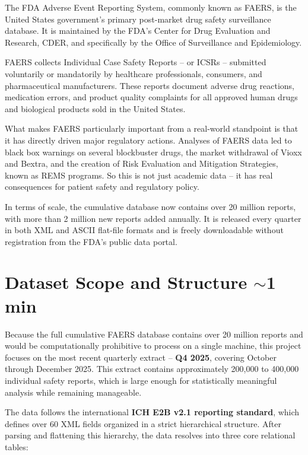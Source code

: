 \documentclass[12pt, letterpaper]{article}
\begin{document}
The FDA Adverse Event Reporting System, commonly known as FAERS, is the United
States government's primary post-market drug safety surveillance database. It is
maintained by the FDA's Center for Drug Evaluation and Research, CDER, and
specifically by the Office of Surveillance and Epidemiology.

FAERS collects Individual Case Safety Reports -- or ICSRs -- submitted
voluntarily or mandatorily by healthcare professionals, consumers, and
pharmaceutical manufacturers. These reports document adverse drug reactions,
medication errors, and product quality complaints for all approved human drugs
and biological products sold in the United States.

What makes FAERS particularly important from a real-world standpoint is that it
has directly driven major regulatory actions. Analyses of FAERS data led to
black box warnings on several blockbuster drugs, the market withdrawal of
Vioxx and Bextra, and the creation of Risk Evaluation and Mitigation Strategies,
known as REMS programs. So this is not just academic data -- it has real
consequences for patient safety and regulatory policy.

In terms of scale, the cumulative database now contains over 20 million reports,
with more than 2 million new reports added annually. It is released every
quarter in both XML and ASCII flat-file formats and is freely downloadable
without registration from the FDA's public data portal.

\section{Dataset Scope and Structure \hfill \textcolor{slidenumber}{\small $\sim$1 min}}

Because the full cumulative FAERS database contains over 20 million reports and
would be computationally prohibitive to process on a single machine, this
project focuses on the most recent quarterly extract -- \textbf{Q4 2025},
covering October through December 2025. This extract contains approximately
200,000 to 400,000 individual safety reports, which is large enough for
statistically meaningful analysis while remaining manageable.

The data follows the international \textbf{ICH E2B v2.1 reporting standard},
which defines over 60 XML fields organized in a strict hierarchical structure.
After parsing and flattening this hierarchy, the data resolves into three core
relational tables:
\end{document}
